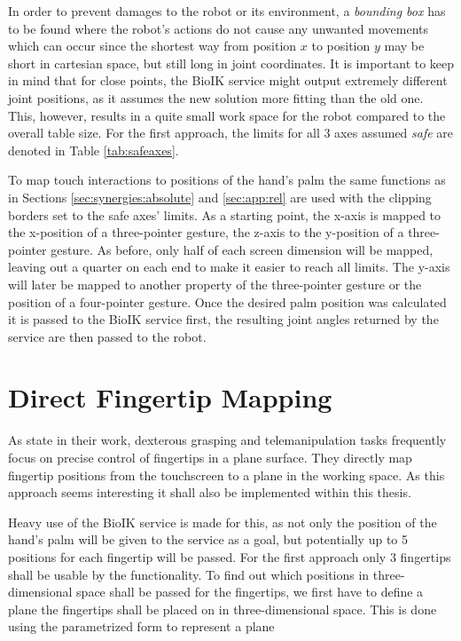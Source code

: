 In order to prevent damages to the robot or its environment, a \textit{bounding box} has to be found where the robot's actions do not cause any unwanted movements which can occur since the shortest way from position $x$ to position $y$ may be short in cartesian space, but still long in joint coordinates. It is important to keep in mind that for close points, the BioIK service might output extremely different joint positions, as it assumes the new solution more fitting than the old one. This, however, results in a quite small work space for the robot compared to the overall table size. For the first approach, the limits for all 3 axes assumed \textit{safe} are denoted in Table \ref{tab:safeaxes}.

To map touch interactions to positions of the hand's palm the same functions as in Sections \ref{sec:synergies:absolute} and \ref{sec:app:rel} are used with the clipping borders set to the safe axes' limits. As a starting point, the x-axis is mapped to the x-position of a three-pointer gesture, the z-axis to the y-position of a three-pointer gesture. As before, only half of each screen dimension will be mapped, leaving out a quarter on each end to make it easier to reach all limits. The y-axis will later be mapped to another property of the three-pointer gesture or the position of a four-pointer gesture. Once the desired palm position was calculated it is passed to the BioIK service first, the resulting joint angles returned by the service are then passed to the robot.

\section{Direct Fingertip Mapping}

As \citeauthor{conf:humanoids:TohHLBZP12} state in their work, dexterous grasping and telemanipulation tasks frequently focus on precise control of fingertips in a plane surface\cite{conf:humanoids:TohHLBZP12}. They directly map fingertip positions from the touchscreen to a plane in the working space. As this approach seems interesting it shall also be implemented within this thesis.

Heavy use of the BioIK service is made for this, as not only the position of the hand's palm will be given to the service as a goal, but potentially up to 5 positions for each fingertip will be passed. For the first approach only 3 fingertips shall be usable by the functionality. To find out which positions in three-dimensional space shall be passed for the fingertips, we first have to define a plane the fingertips shall be placed on in three-dimensional space. This is done using the parametrized form to represent a plane 

